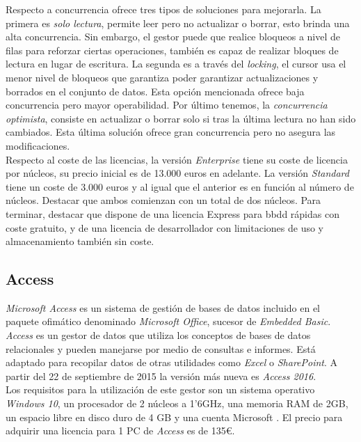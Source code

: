 \documentclass{article}
\begin{document}
Respecto a concurrencia ofrece tres tipos de soluciones para mejorarla. La primera es \emph{solo lectura}, permite leer pero no actualizar o borrar, esto brinda una alta concurrencia. Sin embargo, el gestor puede que realice bloqueos a nivel de filas para reforzar ciertas operaciones, también es capaz de realizar bloques de lectura en lugar de escritura. La segunda es a través del \emph{locking}, el cursor usa el menor nivel de bloqueos que garantiza poder garantizar actualizaciones y borrados en el conjunto de datos. Esta opción mencionada ofrece baja concurrencia pero mayor operabilidad. Por último tenemos, la \emph{concurrencia optimista}, consiste en actualizar o borrar solo si tras la última lectura no han sido cambiados. Esta última solución ofrece gran concurrencia pero no asegura las modificaciones.\\
Respecto al coste de las licencias, la versión \emph{Enterprise} tiene su coste de licencia por núcleos, su precio inicial es de 13.000 euros en adelante. La versión \emph{Standard} tiene un coste de 3.000 euros y al igual que el anterior es en función al número de núcleos. Destacar que ambos comienzan con un total de dos núcleos. Para terminar, destacar que dispone de una licencia Express para bbdd rápidas con coste gratuito, y de una licencia de desarrollador con limitaciones de uso y almacenamiento también sin coste.\\

\subsection{Access}
\emph{Microsoft Access} es un sistema de gestión de bases de datos incluido en el paquete ofimático denominado \emph{Microsoft Office}, sucesor de \emph{Embedded Basic}. \emph{Access} es un gestor de datos que utiliza los conceptos de bases de datos relacionales y pueden manejarse por medio de consultas e informes. Está adaptado para recopilar datos de otras utilidades como \emph{Excel} o \emph{SharePoint}. A partir del 22 de septiembre de 2015 la versión más nueva es \emph{Access 2016}. \cite{ACC:1} \\

Los requisitos para la utilización de este gestor son un sistema operativo \emph{Windows 10}, un procesador de 2 núcleos a 1'6GHz, una memoria RAM de 2GB, un espacio libre en disco duro de 4 GB y una cuenta Microsoft \cite{ACC:2}. El precio para adquirir una licencia para 1 PC de \emph{Access} es de 135\euro. \cite{ACC:3} \\
\end{document}
